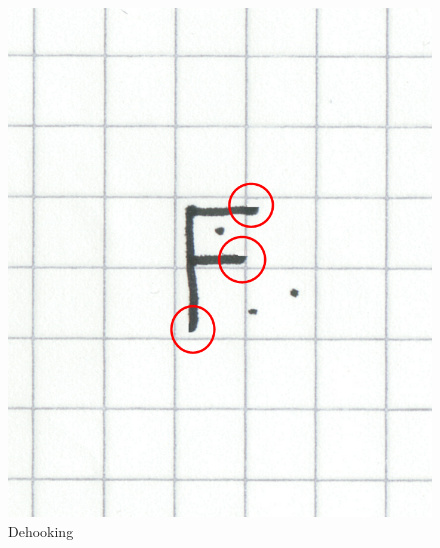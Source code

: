 \begin{figure}[htbp]
\begin{center}
 \includegraphics[scale=1.5]{images/F2afterDehooking.png}
 \caption{Dehooking}
 \label{fig:dehooking}
   \end{center}
 \end{figure}
